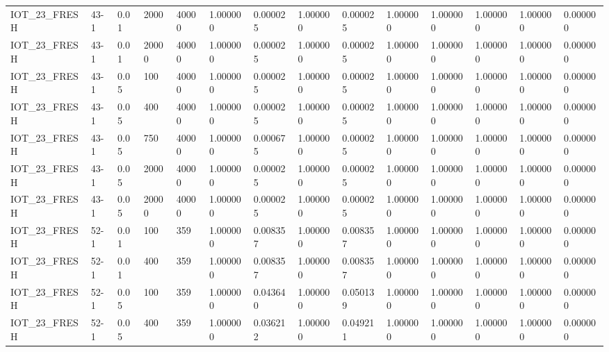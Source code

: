 \begin{tabular}{llllllllllllll}
IOT\_23\_FRESH & 43-1 & 0.01 & 2000 & 40000 & 1.000000 & 0.000025 & 1.000000 & 0.000025 & 1.000000 & 1.000000 & 1.000000 & 1.000000 & 0.000000 \\
IOT\_23\_FRESH & 43-1 & 0.01 & 20000 & 40000 & 1.000000 & 0.000025 & 1.000000 & 0.000025 & 1.000000 & 1.000000 & 1.000000 & 1.000000 & 0.000000 \\
IOT\_23\_FRESH & 43-1 & 0.05 & 100 & 40000 & 1.000000 & 0.000025 & 1.000000 & 0.000025 & 1.000000 & 1.000000 & 1.000000 & 1.000000 & 0.000000 \\
IOT\_23\_FRESH & 43-1 & 0.05 & 400 & 40000 & 1.000000 & 0.000025 & 1.000000 & 0.000025 & 1.000000 & 1.000000 & 1.000000 & 1.000000 & 0.000000 \\
IOT\_23\_FRESH & 43-1 & 0.05 & 750 & 40000 & 1.000000 & 0.000675 & 1.000000 & 0.000025 & 1.000000 & 1.000000 & 1.000000 & 1.000000 & 0.000000 \\
IOT\_23\_FRESH & 43-1 & 0.05 & 2000 & 40000 & 1.000000 & 0.000025 & 1.000000 & 0.000025 & 1.000000 & 1.000000 & 1.000000 & 1.000000 & 0.000000 \\
IOT\_23\_FRESH & 43-1 & 0.05 & 20000 & 40000 & 1.000000 & 0.000025 & 1.000000 & 0.000025 & 1.000000 & 1.000000 & 1.000000 & 1.000000 & 0.000000 \\
IOT\_23\_FRESH & 52-1 & 0.01 & 100 & 359 & 1.000000 & 0.008357 & 1.000000 & 0.008357 & 1.000000 & 1.000000 & 1.000000 & 1.000000 & 0.000000 \\
IOT\_23\_FRESH & 52-1 & 0.01 & 400 & 359 & 1.000000 & 0.008357 & 1.000000 & 0.008357 & 1.000000 & 1.000000 & 1.000000 & 1.000000 & 0.000000 \\
IOT\_23\_FRESH & 52-1 & 0.05 & 100 & 359 & 1.000000 & 0.043640 & 1.000000 & 0.050139 & 1.000000 & 1.000000 & 1.000000 & 1.000000 & 0.000000 \\
IOT\_23\_FRESH & 52-1 & 0.05 & 400 & 359 & 1.000000 & 0.036212 & 1.000000 & 0.049211 & 1.000000 & 1.000000 & 1.000000 & 1.000000 & 0.000000 \\
\bottomrule
\end{tabular}
